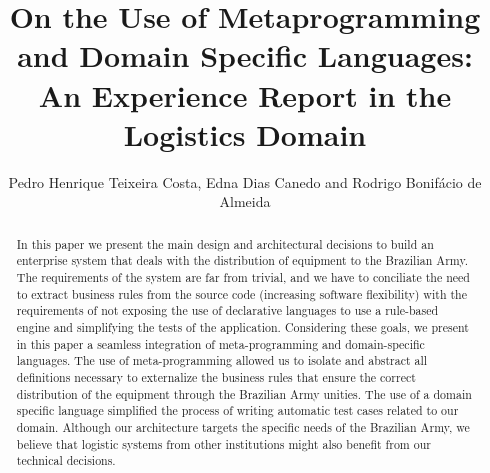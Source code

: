 \documentclass[sigconf]{acmart}
\begin{document}
\title[On the Use of Metaprogramming and DSL: An Experience Report]{On the Use of Metaprogramming and Domain Specific Languages: An Experience Report in the Logistics Domain} 


\author{Pedro Henrique Teixeira Costa, Edna Dias Canedo and Rodrigo Bonif\'{a}cio de Almeida}

\renewcommand{\shortauthors}{-}

\newcommand{\callers}{\emph{high-level rules}\xspace}
\newcommand{\shc}{HLR\xspace}

\begin{abstract}
In this paper we present the main design and architectural decisions to build an enterprise system that deals with the distribution of equipment to the Brazilian Army. The requirements of the system are far from trivial, and we have to conciliate the need to extract business rules from the source code (increasing software flexibility) with the requirements of not exposing the use of declarative languages to use a rule-based engine and simplifying the tests of the application. Considering these goals, we present in this paper a seamless integration of meta-programming and domain-specific languages. The use of meta-programming allowed us to isolate and abstract all definitions necessary to externalize the business rules that ensure the correct distribution of the equipment through the Brazilian Army unities. The use of a domain specific language simplified the process of writing automatic test cases related to our domain. Although our architecture targets the specific needs of the Brazilian Army, we believe that logistic systems from other institutions might also benefit from our technical decisions.
\end{abstract}
\end{document}

